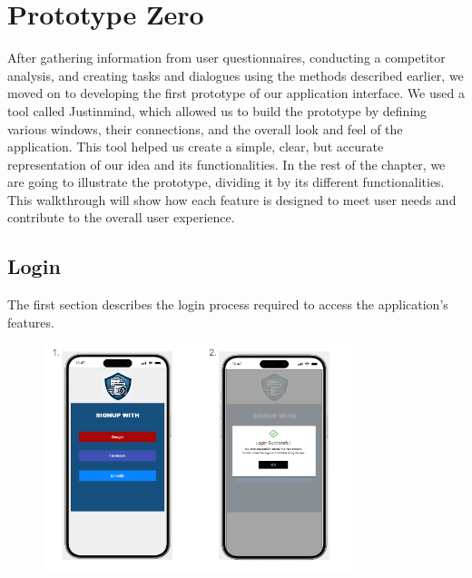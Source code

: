 \section{Prototype Zero}
After gathering information from user questionnaires, conducting a competitor analysis, and creating tasks and dialogues using the methods described earlier, we moved on to developing the first prototype of our application interface. We used a tool called Justinmind, which allowed us to build the prototype by defining various windows, their connections, and the overall look and feel of the application. This tool helped us create a simple, clear, but accurate representation of our idea and its functionalities.
In the rest of the chapter, we are going to illustrate the prototype, dividing it by its different functionalities. This walkthrough will show how each feature is designed to meet user needs and contribute to the overall user experience.
	\subsection{Login}
		The first section describes the login process required to access the application's features.
		\begin{figure}[htbp]
			\centering
			\includegraphics[width=0.80\textwidth]{../mockups/login.png}  %
		\end{figure}
		\clearpage
